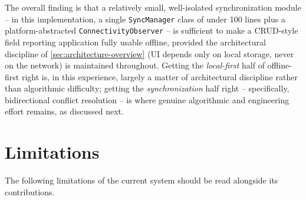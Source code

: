 The overall finding is that a relatively small, well-isolated
synchronization module -- in this implementation, a single
\texttt{SyncManager} class of under 100 lines plus a platform-abstracted
\texttt{ConnectivityObserver} -- is sufficient to make a CRUD-style field
reporting application fully usable offline, provided the architectural
discipline of \cref{sec:architecture-overview} (UI depends only on local
storage, never on the network) is maintained throughout. Getting the
\emph{local-first} half of offline-first right is, in this experience,
largely a matter of architectural discipline rather than algorithmic
difficulty; getting the \emph{synchronization} half right -- specifically,
bidirectional conflict resolution -- is where genuine algorithmic and
engineering effort remains, as discussed next.

\section{Limitations}
\label{sec:limitations}

The following limitations of the current system should be read alongside
its contributions.

